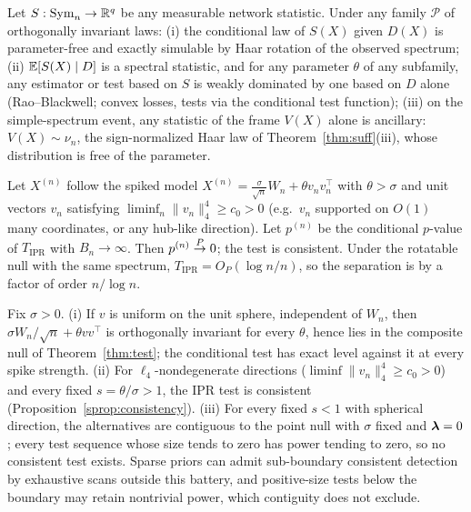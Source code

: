 \begin{corollary}
\label{scor:ancillary}
Let $S:\mathrm{Sym}_n\to\mathbb{R}^q$ be any measurable network statistic. Under any
family $\mathcal{P}$ of orthogonally invariant laws:
(i) the conditional law of $S(X)$ given $D(X)$ is parameter-free and
exactly simulable by Haar rotation of the observed spectrum;
(ii) $\mathbb{E}[S(X)\mid D]$ is a spectral statistic, and for any parameter
$\theta$ of any subfamily, any estimator or test based on $S$ is weakly
dominated by one based on $D$ alone (Rao--Blackwell; convex losses,
tests via the conditional test function);
(iii) on the simple-spectrum event, any statistic of the frame $V(X)$
alone is ancillary: $V(X)\sim\nu_n$, the sign-normalized Haar law of
Theorem~\ref{thm:suff}(iii), whose distribution is free of the
parameter.
\end{corollary}

\begin{proposition}
\label{sprop:consistency}
Let $X^{(n)}$ follow the spiked model
$X^{(n)}=\tfrac{\sigma}{\sqrt n}W_n+\theta v_nv_n^\top$ with $\theta>\sigma$
and unit vectors $v_n$ satisfying
$\liminf_n \lVert v_n\rVert_4^4 \ge c_0>0$
(e.g.\ $v_n$ supported on $O(1)$ many coordinates, or any hub-like
direction). Let $p^{(n)}$ be the conditional $p$-value of
$T_{\mathrm{IPR}}$ with $B_n\to\infty$. Then $p^{(n)}\overset{P}{\to}0$; the test is
consistent. Under the rotatable null with the same spectrum,
$T_{\mathrm{IPR}}=O_P(\log n/n)$, so the separation is by a factor of
order $n/\log n$.
\end{proposition}

\begin{corollary}
\label{scor:boundary}
Fix $\sigma>0$.
(i) If $v$ is uniform on the unit sphere, independent of $W_n$, then
$\sigma W_n/\sqrt n+\theta vv^\top$ is orthogonally invariant for
every $\theta$, hence lies in the composite null of
Theorem~\ref{thm:test}; the conditional test has exact level against
it at every spike strength.
(ii) For $\ell_4$-nondegenerate directions
($\liminf\lVert v_n\rVert_4^4\ge c_0>0$) and every fixed
$s=\theta/\sigma>1$, the IPR test is consistent
(Proposition~\ref{sprop:consistency}).
(iii) For every fixed $s<1$ with spherical direction, the alternatives
are contiguous to the point null with $\sigma$ fixed and $\bm{\lambda}=0$
\citep{perry2018optimality}; every test sequence whose size tends to
zero has power tending to zero, so no consistent test exists.
Sparse priors can admit sub-boundary consistent detection by
exhaustive scans outside this battery, and positive-size tests below
the boundary may retain nontrivial power, which contiguity does not
exclude.
\end{corollary}

